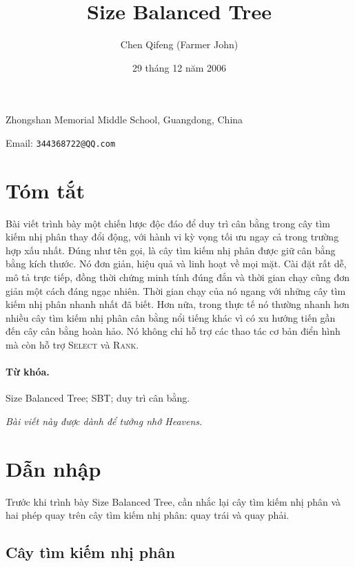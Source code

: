 \documentclass[11pt]{article}
\title{Size Balanced Tree}
\author{Chen Qifeng (Farmer John)}
\date{29 tháng 12 năm 2006}
\begin{document}
\maketitle


\begin{center}
Zhongshan Memorial Middle School, Guangdong, China

Email: \texttt{344368722@QQ.com}
\end{center}

\section*{Tóm tắt}

Bài viết trình bày một chiến lược độc đáo để duy trì cân bằng trong cây tìm
kiếm nhị phân thay đổi động, với hành vi kỳ vọng tối ưu ngay cả trong trường
hợp xấu nhất. Đúng như tên gọi,  là cây tìm kiếm nhị
phân được giữ cân bằng bằng kích thước. Nó đơn giản, hiệu quả và linh hoạt về
mọi mặt. Cài đặt rất dễ, mô tả trực tiếp, đồng thời chứng minh tính đúng đắn
và thời gian chạy cũng đơn giản một cách đáng ngạc nhiên. Thời gian chạy của
nó ngang với những cây tìm kiếm nhị phân nhanh nhất đã biết. Hơn nữa, trong
thực tế nó thường nhanh hơn nhiều cây tìm kiếm nhị phân cân bằng nổi tiếng
khác vì có xu hướng tiến gần đến cây cân bằng hoàn hảo. Nó không chỉ hỗ trợ
các thao tác cơ bản điển hình mà còn hỗ trợ \textsc{Select} và \textsc{Rank}.

\paragraph{Từ khóa.}
Size Balanced Tree; SBT; duy trì cân bằng.

\begin{center}
\textit{Bài viết này được dành để tưởng nhớ Heavens.}
\end{center}

\section{Dẫn nhập}

Trước khi trình bày Size Balanced Tree, cần nhắc lại cây tìm kiếm nhị phân và
hai phép quay trên cây tìm kiếm nhị phân: quay trái và quay phải.

\subsection{Cây tìm kiếm nhị phân}
\end{document}
